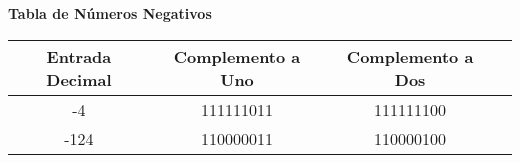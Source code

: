 \begin{center}
    \textbf{Tabla de Números Negativos}
    
    \begin{tabular}{|c|c|c|c|}
    \hline
    \textbf{Entrada Decimal} & \textbf{Complemento a Uno} & \textbf{Complemento a Dos} \\
    \hline
    -4 & 111111011 & 111111100 \\
    \hline
    -124 & 110000011 & 110000100\\
    \hline
    \end{tabular}
\end{center}
